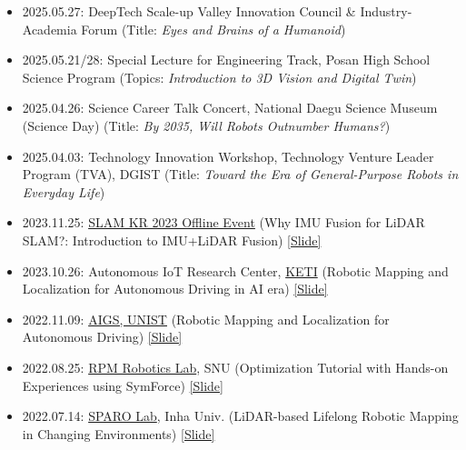 \begin{itemize}[label=$\cdot$]
    \item 2025.05.27: DeepTech Scale-up Valley Innovation Council \& Industry-Academia Forum  
    \hfill (Title: \textit{Eyes and Brains of a Humanoid})
    
    \item 2025.05.21/28: Special Lecture for Engineering Track, Posan High School Science Program  
    \hfill (Topics: \textit{Introduction to 3D Vision and Digital Twin})
    
    \item 2025.04.26: Science Career Talk Concert, National Daegu Science Museum (Science Day)  
    \hfill (Title: \textit{By 2035, Will Robots Outnumber Humans?})
    
    \item 2025.04.03: Technology Innovation Workshop, Technology Venture Leader Program (TVA), DGIST  
    \hfill (Title: \textit{Toward the Era of General-Purpose Robots in Everyday Life})

    \item 2023.11.25: \href{https://drive.google.com/file/d/1h5sMgkyGGA8X2gxJUEzWCSwX9RlujNpe/view?usp=sharing}{SLAM KR 2023 Offline Event} (Why IMU Fusion for LiDAR SLAM?: Introduction to IMU+LiDAR Fusion) \href{https://bit.ly/20231125_slamkr_giseopkim}{[Slide]}
    
    \item 2023.10.26: Autonomous IoT Research Center, \href{https://www.keti.re.kr/eng/main/main.php}{KETI} (Robotic Mapping and Localization for Autonomous Driving in AI era) \href{https://bit.ly/408J7XJ}{[Slide]}
    
    \item 2022.11.09: \href{https://ib.unist.ac.kr/robust-slam-simultaneous-localization-and-mapping-for-large-scale-urban-mapping-and-autonomous-driving/}{AIGS, UNIST} (Robotic Mapping and Localization for Autonomous Driving) \href{https://docs.google.com/presentation/d/1RLrrxGzzGWEgUQMvdWH0wNfsyn6ML2Hjw88PmgdrvlQ/edit?usp=sharing}{[Slide]}
    
    \item 2022.08.25: \href{https://rpm.snu.ac.kr/}{RPM Robotics Lab}, SNU (Optimization Tutorial with Hands-on Experiences using SymForce) \href{https://docs.google.com/presentation/d/1Z1FjnphgP60jTIa6da8vwhaAEzULefLrPQsJ4yBHAJA/edit?usp=sharing}{[Slide]}
    
    \item 2022.07.14: \href{https://sites.google.com/view/sparo/홈}{SPARO Lab}, Inha Univ. (LiDAR-based Lifelong Robotic Mapping in Changing Environments) \href{https://docs.google.com/presentation/d/1Muld60rT7KY_FaN4hyRaPHR2FsPkLV8z7fz7rYQzIv4/edit?usp=sharing}{[Slide]}
    

\end{itemize}

